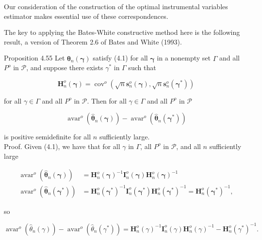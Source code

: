 \documentclass[10pt]{article}
\begin{document}
Our consideration of the construction of the optimal instrumental variables estimator makes essential use of these correspondences.

The key to applying the Bates-White constructive method here is the following result, a version of Theorem 2.6 of Bates and White (1993).

Proposition 4.55 Let $\hat{\boldsymbol{\theta}}_{n}(\boldsymbol{\gamma})$ satisfy (4.1) for all $\boldsymbol{\gamma}$ in a nonempty set $\Gamma$ and all $P^{o}$ in $\mathcal{P}$, and suppose there exists $\gamma^{*}$ in $\Gamma$ such that


\begin{equation*}
\mathbf{H}_{n}^{o}(\boldsymbol{\gamma})=\operatorname{cov}^{o}\left(\sqrt{n} \mathbf{s}_{n}^{o}(\boldsymbol{\gamma}), \sqrt{n} \mathbf{s}_{n}^{o}\left(\boldsymbol{\gamma}^{*}\right)\right) \tag{4.2}
\end{equation*}


for all $\gamma \in \Gamma$ and all $P^{o}$ in $\mathcal{P}$. Then for all $\gamma \in \Gamma$ and all $P^{o}$ in $\mathcal{P}$

$$
\operatorname{avar}^{o}\left(\hat{\boldsymbol{\theta}}_{n}(\boldsymbol{\gamma})\right)-\operatorname{avar}^{o}\left(\hat{\boldsymbol{\theta}}_{n}\left(\boldsymbol{\gamma}^{*}\right)\right)
$$

is positive semidefinite for all $n$ sufficiently large.\\
Proof. Given (4.1), we have that for all $\gamma$ in $\Gamma$, all $P^{o}$ in $\mathcal{P}$, and all $n$ sufficiently large

$$
\begin{aligned}
\operatorname{avar}^{o}\left(\hat{\boldsymbol{\theta}}_{n}(\boldsymbol{\gamma})\right) & =\mathbf{H}_{n}^{o}(\boldsymbol{\gamma})^{-1} \mathbf{I}_{n}^{o}(\boldsymbol{\gamma}) \mathbf{H}_{n}^{o}(\boldsymbol{\gamma})^{-1} \\
\operatorname{avar}^{o}\left(\hat{\boldsymbol{\theta}}_{n}\left(\boldsymbol{\gamma}^{*}\right)\right) & =\mathbf{H}_{n}^{o}\left(\boldsymbol{\gamma}^{*}\right)^{-1} \mathbf{I}_{n}^{o}\left(\boldsymbol{\gamma}^{*}\right) \mathbf{H}_{n}^{o}\left(\boldsymbol{\gamma}^{*}\right)^{-1}=\mathbf{H}_{n}^{o}\left(\boldsymbol{\gamma}^{*}\right)^{-1},
\end{aligned}
$$

so

$$
\operatorname{avar}^{o}\left(\hat{\theta}_{n}(\gamma)\right)-\operatorname{avar}^{o}\left(\hat{\theta}_{n}\left(\gamma^{*}\right)\right)=\mathbf{H}_{n}^{o}(\gamma)^{-1} \mathbf{I}_{n}^{o}(\gamma) \mathbf{H}_{n}^{o}(\gamma)^{-1}-\mathbf{H}_{n}^{o}\left(\gamma^{*}\right)^{-1} .
$$
\end{document}

